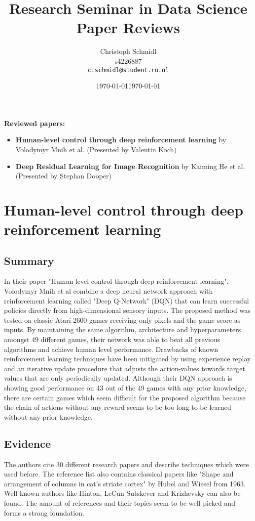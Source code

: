 \documentclass[a4paper]{article}
\title{Research Seminar in Data Science\\Paper Reviews}
\author{
  Christoph Schmidl\\ s4226887\\      \texttt{c.schmidl@student.ru.nl}
}
\date{\today}
\date{\today}
\begin{document}
\maketitle

\textbf{Reviewed papers:}

\begin{itemize}
	\item \textbf{Human-level control through deep reinforcement learning} by Volodymyr Mnih et al. (Presented by Valentin Koch)
	\item \textbf{Deep Residual Learning for Image Recognition} by Kaiming He et al. (Presented by Stephan Dooper)
\end{itemize}


\section{Human-level control through deep reinforcement learning}

\subsection{Summary}

In their paper "Human-level control through deep reinforcement learning", Volodymyr Mnih et al combine a deep neural network approach with reinforcement learning called "Deep Q-Network" (DQN) that can learn successful policies directly from high-dimensional sensory inputs. The proposed method was tested on classic Atari 2600 games receiving only pixels and the game score as inputs. By maintaining the same algorithm, architecture and hyperparameters amongst 49 different games, their network was able to beat all previous algorithms and achieve human level performance. Drawbacks of known reinforcement learning techniques have been mitigated by using experience replay and an iterative update procedure that adjusts the action-values towards target values that are only periodically updated. Although their DQN approach is showing good performance on 43 out of the 49 games with any prior knowledge, there are certain games which seem difficult for the proposed algorithm because the chain of actions without any reward seems to be too long to be learned without any prior knowledge.

\subsection{Evidence}

The authors cite 30 different research papers and describe techniques which were used before. The reference list also contains classical papers like "Shape and arrangement of columns in cat's striate cortex" by Hubel and Wiesel from 1963. Well known authors like Hinton, LeCun Sutskever and Krizhevsky can also be found. The amount of references and their topics seem to be well picked and forms a strong foundation.
\end{document}
